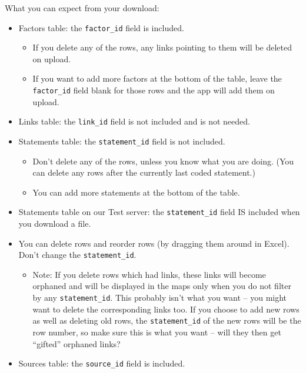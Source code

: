 \documentclass[
]{book}
\providecommand{\tightlist}{%
  \setlength{\itemsep}{0pt}\setlength{\parskip}{0pt}}
\begin{document}
What you can expect from your download:

\begin{itemize}
\tightlist
\item
  Factors table: the \texttt{factor\_id} field is included.

  \begin{itemize}
  \tightlist
  \item
    If you delete any of the rows, any links pointing to them will be deleted on upload.
  \item
    If you want to add more factors at the bottom of the table, leave the \texttt{factor\_id} field blank for those rows and the app will add them on upload.
  \end{itemize}
\item
  Links table: the \texttt{link\_id} field is not included and is not needed.
\item
  Statements table: the \texttt{statement\_id} field is not included.

  \begin{itemize}
  \tightlist
  \item
    Don't delete any of the rows, unless you know what you are doing. (You can delete any rows after the currently last coded statement.)
  \item
    You can add more statements at the bottom of the table.
  \end{itemize}
\item
  Statements table on our Test server: the \texttt{statement\_id} field IS included when you download a file.
\item
  You can delete rows and reorder rows (by dragging them around in Excel). Don't change the \texttt{statement\_id}.

  \begin{itemize}
  \tightlist
  \item
    Note: If you delete rows which had links, these links will become orphaned and will be displayed in the maps only when you do not filter by any \texttt{statement\_id}. This probably isn't what you want -- you might want to delete the corresponding links too. If you choose to add new rows as well as deleting old rows, the \texttt{statement\_id} of the new rows will be the row number, so make sure this is what you want -- will they then get ``gifted'' orphaned links?
  \end{itemize}
\item
  Sources table: the \texttt{source\_id} field is included.


\end{itemize}
\end{document}
